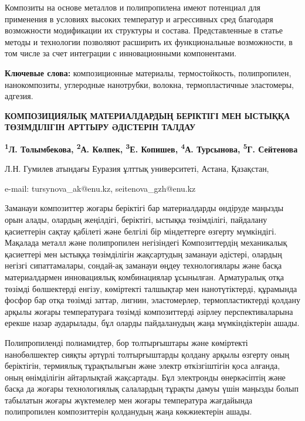 Композиты на основе металлов и полипропилена имеют потенциал для
применения в условиях высоких температур и агрессивных сред благодаря
возможности модификации их структуры и состава. Представленные в статье
методы и технологии позволяют расширить их функциональные возможности, в
том числе за счет интеграции с инновационными компонентами.

{\bfseries Ключевые слова:} композиционные материалы, термостойкость,
полипропилен, нанокомпозиты, углеродные нанотрубки, волокна,
термопластичные эластомеры, адгезия.

\begin{articleheader}
{\bfseries КОМПОЗИЦИЯЛЫҚ МАТЕРИАЛДАРДЫҢ БЕРІКТІГІ МЕН ЫСТЫҚҚА ТӨЗІМДІЛІГІН АРТТЫРУ ӘДІСТЕРІН ТАЛДАУ}

{\bfseries
\textsuperscript{1}Л. Толымбекова,
\textsuperscript{2}А. Көлпек,
\textsuperscript{3}Е. Копишев,
\textsuperscript{4}А. Турсынова\textsuperscript{\envelope },
\textsuperscript{5}Г. Сейтенова\textsuperscript{\envelope }
}
\end{articleheader}

\begin{affiliation}
Л.Н. Гумилев атындағы Еуразия ұлттық университеті, Астана, Қазақстан,

e-mail: tursynova\_ak@enu.kz, seitenova\_gzh@enu.kz
\end{affiliation}

Заманауи композиттер жоғары беріктігі бар материалдарды өндіруде маңызды
орын алады, олардың жеңілдігі, беріктігі, ыстыққа төзімділігі, пайдалану
қасиеттерін сақтау қабілеті және белгілі бір міндеттерге өзгерту
мүмкіндігі. Мақалада металл және полипропилен негізіндегі Композиттердің
механикалық қасиеттері мен ыстыққа төзімділігін жақсартудың заманауи
әдістері, олардың негізгі сипаттамалары, сондай-ақ заманауи өңдеу
технологиялары және басқа материалдармен инновациялық комбинациялар
ұсынылған. Арматуралық отқа төзімді бөлшектерді енгізу, көміртекті
талшықтар мен нанотүтіктерді, құрамында фосфор бар отқа төзімді заттар,
лигнин, эластомерлер, термопластиктерді қолдану арқылы жоғары
температураға төзімді композиттерді әзірлеу перспективаларына ерекше
назар аударылады, бұл оларды пайдаланудың жаңа мүмкіндіктерін ашады.

Полипропиленді полиамидтер, бор толтырғыштары және көміртекті
нанобөлшектер сияқты әртүрлі толтырғыштарды қолдану арқылы өзгерту оның
беріктігін, термиялық тұрақтылығын және электр өткізгіштігін қоса
алғанда, оның өнімділігін айтарлықтай жақсартады. Бұл электронды
өнеркәсіптің және басқа да жоғары технологиялық салалардың тұрақты дамуы
үшін маңызды болып табылатын жоғары жүктемелер мен жоғары температура
жағдайында полипропилен композиттерін қолданудың жаңа көкжиектерін
ашады.

